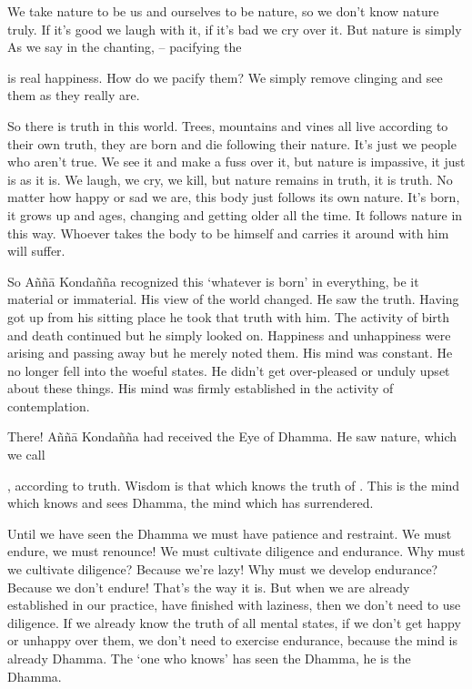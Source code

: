 We take nature to be us and ourselves to be nature, so we don't know nature truly. If it's good we laugh with it, if it's bad we cry over it. But nature is simply  As we say in the chanting,  -- pacifying the { is real happiness. How do we pacify them? We simply remove clinging and see them as they really are.

So there is truth in this world. Trees, mountains and vines all live according to their own truth, they are born and die following their nature. It's just we people who aren't true. We see it and make a fuss over it, but nature is impassive, it just is as it is. We laugh, we cry, we kill, but nature remains in truth, it is truth. No matter how happy or sad we are, this body just follows its own nature. It's born, it grows up and ages, changing and getting older all the time. It follows nature in this way. Whoever takes the body to be himself and carries it around with him will suffer. 

So A\~n\~n\=a Konda\~n\~na recognized this `whatever is born' in everything, be it material or immaterial. His view of the world changed. He saw the truth. Having got up from his sitting place he took that truth with him. The activity of birth and death continued but he simply looked on. Happiness and unhappiness were arising and passing away but he merely noted them. His mind was constant. He no longer fell into the woeful states. He didn't get over-pleased or unduly upset about these things. His mind was firmly established in the activity of contemplation.

There! A\~n\~n\=a Konda\~n\~na had received the Eye of Dhamma. He saw nature, which we call {, according to truth. Wisdom is that which knows the truth of {}. This is the mind which knows and sees Dhamma, the mind which has surrendered. 

Until we have seen the Dhamma we must have patience and restraint. We must endure, we must renounce! We must cultivate diligence and endurance. Why must we cultivate diligence? Because we're lazy! Why must we develop endurance? Because we don't endure! That's the way it is. But when we are already established in our practice, have finished with laziness, then we don't need to use diligence. If we already know the truth of all mental states, if we don't get happy or unhappy over them, we don't need to exercise endurance, because the mind is already Dhamma. The `one who knows' has seen the Dhamma, he is the Dhamma. 

}}

